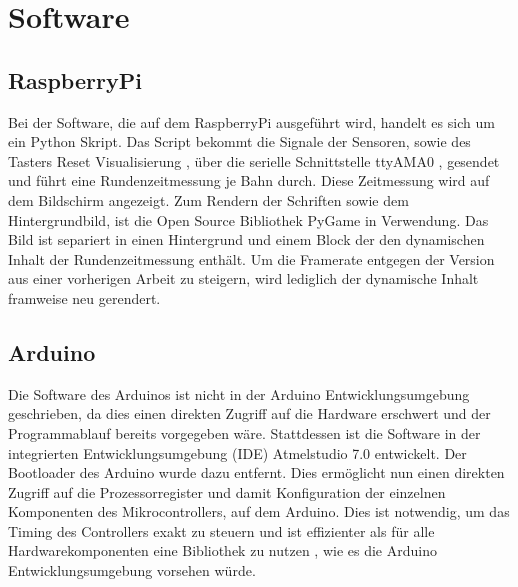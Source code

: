 \documentclass[a4paper, 11pt]{report}
\begin{document}
\chapter{Software}
	\section{RaspberryPi}\label{sec:SoftPi}
		Bei der Software, die auf dem RaspberryPi ausgeführt wird, handelt es sich um ein Python Skript.
		Das Script bekommt die Signale der Sensoren, sowie des Tasters \glqq Reset Visualisierung \grqq, über die serielle Schnittstelle \glqq ttyAMA0 \grqq, 
		gesendet und führt eine Rundenzeitmessung je Bahn durch.
		Diese Zeitmessung wird auf dem Bildschirm angezeigt.
		Zum Rendern der Schriften sowie dem Hintergrundbild, ist die Open Source Bibliothek \glqq PyGame\grqq{} in Verwendung.
		Das Bild ist separiert in einen Hintergrund und einem Block der den dynamischen Inhalt der Rundenzeitmessung enthält.
		Um die Framerate entgegen der Version aus einer vorherigen Arbeit zu steigern, wird lediglich der dynamische Inhalt framweise neu gerendert.
	\section{Arduino}
		Die Software des Arduinos ist nicht in der Arduino Entwicklungsumgebung geschrieben, da dies einen direkten Zugriff auf die Hardware erschwert und der Programmablauf bereits vorgegeben wäre.
		Stattdessen ist die Software in der integrierten Entwicklungsumgebung (IDE) \glqq Atmelstudio 7.0\grqq{} entwickelt.
		Der Bootloader des Arduino wurde dazu entfernt.
		Dies ermöglicht nun einen direkten Zugriff auf die Prozessorregister und damit Konfiguration der einzelnen Komponenten des Mikrocontrollers, auf dem Arduino.
		Dies ist notwendig, um das Timing des Controllers exakt zu steuern und ist effizienter als für alle Hardwarekomponenten eine Bibliothek zu nutzen , wie es die Arduino Entwicklungsumgebung vorsehen würde.
\end{document}
